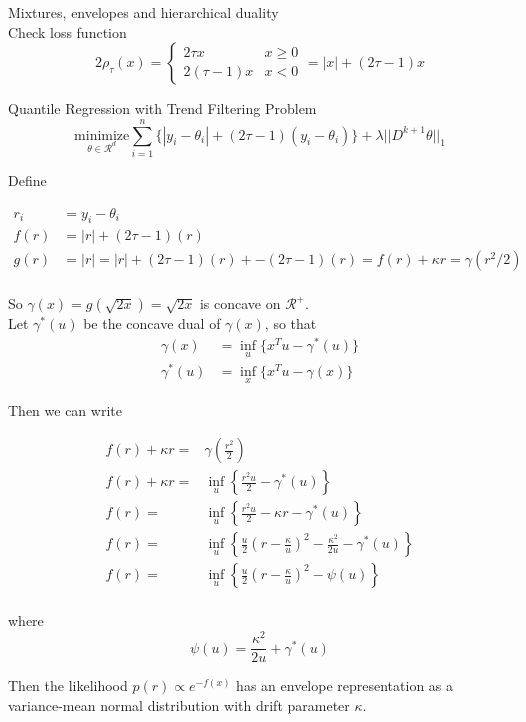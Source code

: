 \documentclass[]{article}
\begin{document}
Mixtures, envelopes and hierarchical duality\\

Check loss function 
$$2\rho_{\tau}(x) = \begin{cases}
2\tau x & x \ge 0\\
2(\tau-1)x & x < 0
\end{cases} = |x| + (2\tau-1)x
$$

Quantile Regression with Trend Filtering Problem
$$\underset{\theta \in \mathcal{R}^d}{\text{minimize}}\sum_{i=1}^n\{|y_i - \theta_i| + (2\tau-1)(y_i-\theta_i)\} + \lambda||D^{k+1}\theta||_1$$

Define 

\begin{align*}
r_i &= y_i - \theta_i\\
f(r) &= |r| + (2\tau-1)(r)\\
g(r) &= |r| = |r| + (2\tau-1)(r) + -(2\tau-1)(r) = f(r) + \kappa r = \gamma(r^2/2)\\
\end{align*}

So $\gamma(x) = g(\sqrt{2x}) = \sqrt{2x}$ is concave on $\mathcal{R}^+$. \\

Let $\gamma^*(u)$ be the concave dual of $\gamma(x)$, so that  
\begin{align*}
\gamma(x) &= \inf_u\{x^Tu - \gamma^*(u)\}\\
\gamma^*(u) &= \inf_x\{x^Tu - \gamma(x)\}
\end{align*}

Then we can write 

\begin{align*}
	f(r) + \kappa r =& \gamma\left(\frac{r^2}{2}\right)\\
	f(r) + \kappa r =& \inf_u\left\{\frac{r^2u}{2} - \gamma^*(u)\right\}\\
	f(r) 			=& \inf_u\left\{\frac{r^2u}{2} - \kappa r - \gamma^*(u)\right\} \\
	f(r)			=& \inf_u\left\{\frac{u}{2}\left(r - \frac{\kappa}{u}\right)^2 - \frac{\kappa^2}{2u} - \gamma^*(u)\right\}\\
		f(r)			=& \inf_u\left\{\frac{u}{2}\left(r - \frac{\kappa}{u}\right)^2 - \psi(u)\right\}\\
\end{align*}

where $$\psi(u) =  \frac{\kappa^2}{2u} + \gamma^*(u)$$

Then the likelihood $p(r) \propto e^{-f(x)}$ has an envelope representation as a variance-mean normal distribution with drift parameter $\kappa$. 
\end{document}
